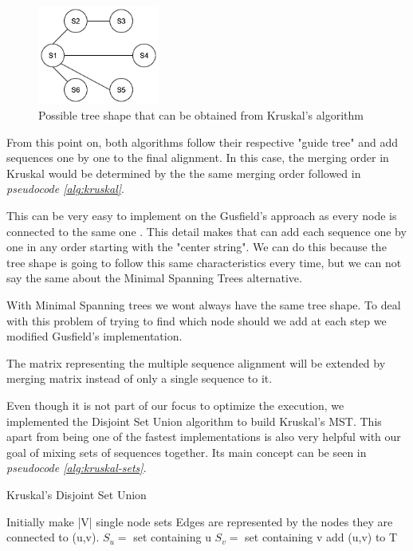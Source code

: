 \documentclass[twoside,openright,titlepage,numbers=noenddot,headinclude,%
                footinclude=true,cleardoublepage=empty,abstractoff, %
                BCOR=5mm,paper=a4,fontsize=11pt,%
                ngerman,american,%
                ]{scrreprt}
\begin{document}
\begin{figure}[h]
\includegraphics[width=4cm]{mst2.png}
\centering
\caption{Possible tree shape that can be obtained from Kruskal's algorithm}
\label{fig:mst_graph}
\end{figure}

From this point on, both algorithms follow their respective "guide tree" and add sequences one by one to the final alignment. In this case, the merging order in Kruskal would be determined by the the same merging order followed in \textit{pseudocode \ref{alg:kruskal}}.

This can be very easy to implement on the Gusfield's approach as every node is connected to the same one \cite{Gusfield_1997}. This detail makes that can add each sequence one by one in any order starting with the "center string". We can do this because the tree shape is going to follow this same characteristics every time, but we can not say the same about the Minimal Spanning Trees alternative.

With Minimal Spanning trees we wont always have the same tree shape. To deal with this problem of trying to find which node should we add at each step we modified Gusfield's implementation.

The matrix representing the multiple sequence alignment will be extended by merging matrix instead of only a single sequence to it.

Even though it is not part of our focus to optimize the execution, we implemented the Disjoint Set Union algorithm \cite{disjointsetunion} to build Kruskal's MST. This apart from being one of the fastest implementations is also very helpful with our goal of mixing sets of sequences together. Its main concept can be seen in \textit{pseudocode \ref{alg:kruskal-sets}}. 

\begin{algorithm}
	\caption{Kruskal's Disjoint Set Union} 
    \label{alg:kruskal-sets}
	\begin{algorithmic}[1]
        \State Initially make |V| single node sets
        \State Edges are represented by the nodes they are connected to (u,v).
            \State $S_u =$ set containing u
            \State $S_v =$ set containing v
		          \State add (u,v) to T
		      \EndIf
		\EndFor
	\end{algorithmic} 
\end{algorithm}
\end{document}

